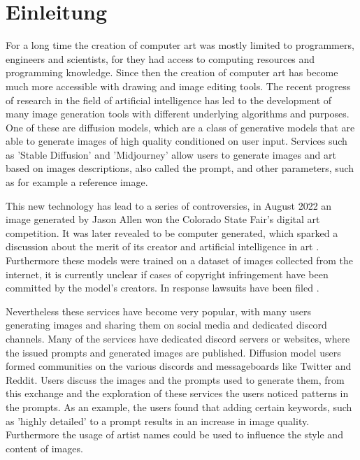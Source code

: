 \chapter{Einleitung}
\label{cha:Introduction}

For a long time the creation of computer art was mostly limited to programmers, engineers and scientists, for they had access to computing resources and programming knowledge. Since then the creation of computer art has become much more accessible with drawing and image editing tools. The recent progress of research in the field of artificial intelligence has led to the development of many image generation tools with different underlying algorithms and purposes. One of these are diffusion models, which are a class of generative models that are able to generate images of high quality conditioned on user input. Services such as 'Stable Diffusion' and 'Midjourney' allow users to generate images and art based on images descriptions, also called the prompt, and other parameters, such as for example a reference image.

This new technology has lead to a series of controversies, in August 2022 an image generated by Jason Allen won the Colorado State Fair's digital art competition. It was later revealed to be computer generated, which sparked a discussion about the merit of its creator and artificial intelligence in art \autocite{colorado}. Furthermore these models were trained on a dataset of images collected from the internet, it is currently unclear if cases of copyright infringement have been committed by the model's creators. In response lawsuits have been filed \autocite{getty}.

Nevertheless these services have become very popular, with many users generating images and sharing them on social media and dedicated discord channels. Many of the services have dedicated discord servers or websites, where the issued prompts and generated images are published. Diffusion model users formed communities on the various discords and messageboards like Twitter and Reddit. Users discuss the images and the prompts used to generate them, from this exchange and the exploration of these services the users noticed patterns in the prompts. As an example, the users found that adding certain keywords, such as 'highly detailed' to a prompt results in an increase in image quality. Furthermore the usage of artist names could be used to influence the style and content of images.


